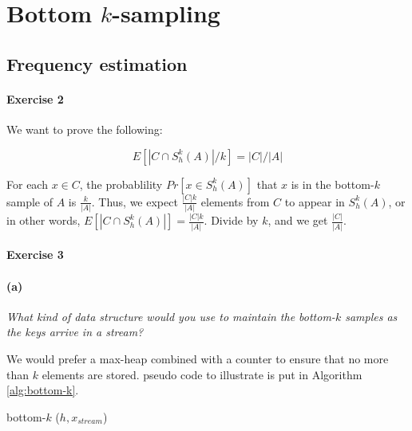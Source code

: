 \section{Bottom $k$-sampling}

\subsection{Frequency estimation}

\paragraph{Exercise 2}
We want to prove the following:

\[
    E[|C \cap S^k_h(A)|/k] = |C|/|A|
\]

For each $x \in C$, the probablility $Pr[x \in S^k_h(A)]$ that $x$ is in the bottom-$k$ sample of $A$ is $\frac{k}{|A|}$. Thus, we expect $\frac{|C|k}{|A|}$ elements from $C$ to appear in $S^k_h(A)$, or in other words, $E[|C \cap S^k_h(A)|] = \frac{|C|k}{|A|}$. Divide by $k$, and we get $\frac{|C|}{|A|}$. 

\paragraph{Exercise 3}

\paragraph*{(a)} \textit{What kind of data structure would you use to maintain the bottom-$k$ samples as the keys arrive in a stream?}

We would prefer a max-heap combined with a counter to ensure that no more than $k$ elements are stored.
pseudo code to illustrate is put in Algorithm \ref{alg:bottom-k}.

\begin{algorithm}
  \caption{bottom-$k$ ($h, x_{stream}$)}
  \label{alg:bottom-k}
\end{algorithm}

